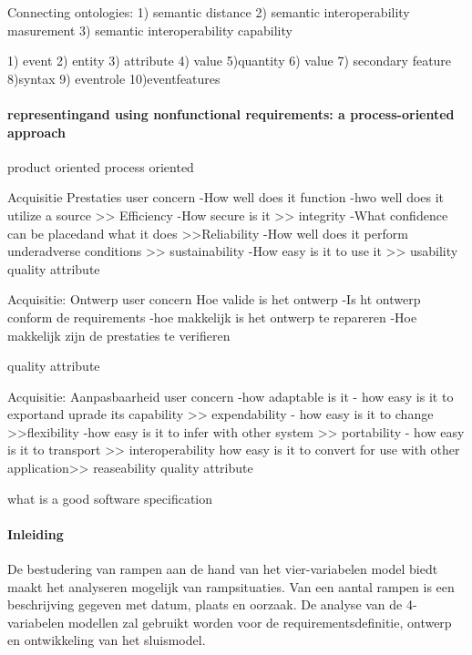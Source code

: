 Connecting ontologies:
1) semantic distance
2) semantic interoperability masurement
3) semantic interoperability capability

1) event
2) entity
3) attribute
4) value
5)quantity
6) value
7) secondary feature
8)syntax
9) eventrole
10)eventfeatures




\paragraph{representingand using nonfunctional requirements: a process-oriented approach}
product oriented
process oriented


Acquisitie Prestaties
user concern
-How well does it function
-hwo well does it utilize a source >> Efficiency
-How secure is it >> integrity
-What confidence can be placedand what it does >>Reliability
-How well does it perform underadverse conditions >> sustainability
-How easy is it to use it >> usability
quality attribute


Acquisitie: Ontwerp
user concern
Hoe valide is het ontwerp
-Is ht ontwerp conform de requirements
-hoe makkelijk is het ontwerp te repareren
-Hoe makkelijk zijn de prestaties te verifieren

quality attribute


Acquisitie: Aanpasbaarheid
user concern
-how adaptable is it
- how easy is it to exportand uprade its capability >> expendability
- how easy is it to change >>flexibility
-how easy is it to infer with other system >> portability
- how easy is it to transport >> interoperability
how easy is it to convert for use with other application>> reaseability
quality attribute


what is a good software specification

\cite{fvaandrager2322010Goodmodel}
\cite{onix01102022devopmodel}
\cite{sulemani04012021softwareprocesmodel}
\cite{globalluxsoft18102017softdev}
\cite{wiegers30052022SRS}
\cite{muller06092020goodspecification}
\cite{informit30062008reqmanagement}
\cite{altexsoft15092020writingSRS}


 


\paragraph{Inleiding}
De bestudering van rampen aan de hand van het vier-variabelen model biedt maakt het analyseren mogelijk van rampsituaties. Van een aantal rampen is een beschrijving gegeven met datum, plaats en oorzaak. De analyse van de 4-variabelen modellen zal gebruikt worden voor de requirementsdefinitie, ontwerp en ontwikkeling van het sluismodel. 


